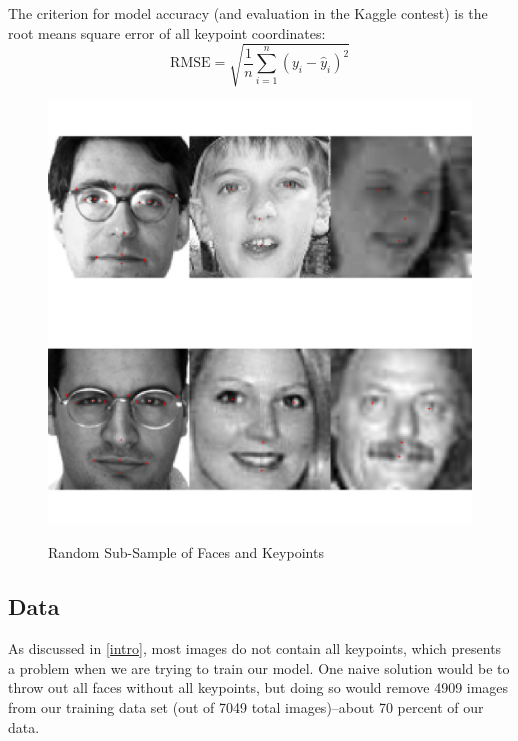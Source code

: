 \documentclass[journal]{IEEEtran}
\begin{document}
The criterion for model accuracy (and evaluation in the Kaggle contest) is the root means square error of all keypoint coordinates:
\[ \text{RMSE}=\sqrt{\frac{1}{n} \sum_{i=1}^{n} \left( y_i - \hat{y}_i\right)^2} \]

\begin{figure}[!ht]
  \centering
  \caption{Random Sub-Sample of Faces and Keypoints}
  \includegraphics[scale=.49]{random_faces.pdf}
  \label{fig:random_faces}
\end{figure}

\subsection{Data}

As discussed in \cref{intro}, most images do not contain all keypoints, which presents a problem when we are trying to train our model. One naive solution would be to throw out all faces without all keypoints, but doing so would remove 4909 images from our training data set (out of 7049 total images)--about 70 percent of our data.
\end{document}
